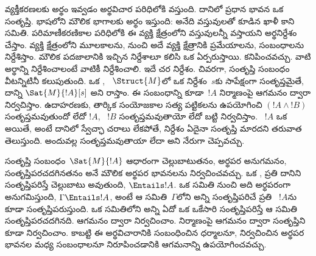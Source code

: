 \documentclass[../../../include/open-logic-section]{subfiles}
\begin{document}


వ్యక్తీకరణలకు అర్థం ఇవ్వడం అర్థవిచార పరిధిలోకి వస్తుంది. దానిలో ప్రధాన భావన ఒక  సంతృప్తి.  భాషలోని
మౌలిక భాగాలకు అర్థం ఇస్తుంది:  అనేది వస్తువులతో కూడిన ఖాళీ కాని
సమితి. పరిమాణీకరణికాల పరిధిలోకి ఈ వ్యక్తి క్షేత్రంలోని వస్తువులన్నీ వస్తాయని
అర్థనిర్దేశం చేస్తాం.  వ్యక్తి క్షేత్రంలోని మూలకాలను,
  నుంచి అదే వ్యక్తి క్షేత్రానికి ప్రమేయాలను,
  సంబంధాలను నిర్దేశిస్తాం. మౌలిక
పదజాలానికి ఇచ్చిన నిర్దేశాలూ  కలిసి ఒక 
ఏర్పరుస్తాయి.   కనిపించవచ్చు. వాటి అర్థాన్ని నిర్దేశించాలంటే
  వాటికీ నిర్దేశించాలి. ఇదే చర నిర్దేశం. చివరగా, సంతృప్తి సంబంధం వీటన్నిటినీ
కలుపుతుంది. ఒక , ~$\Struct{M}$లో
ఒక  నిర్దేశం~$s$కు సాపేక్షంగా సంతృప్తమైతే, దాన్ని
$\Sat{M}{!A}[s]$ అని రాస్తాం. ఈ సంబంధాన్ని కూడా~$!A$ నిర్మాణంపై
ఆగమనం ద్వారా నిర్వచిస్తాం. ఉదాహరణకు, తార్కిక సంయోజకాల సత్య
పట్టికలను ఉపయోగించి $(!A \land !B)$ సంతృప్తమవుతుందో లేదో $!A$, ~$!B$
సంతృప్తమవుతాయో లేదో బట్టి నిర్వచిస్తాం. ~$!A$ ఒక
 అయితే, అంటే దానిలో స్వేచ్ఛా చరాలు లేకపోతే,
 నిర్దేశం ఏదైనా సంతృప్తి మారదని తరువాత తెలుస్తుంది. అందువల్ల
  సంతృప్తమవుతాయా లేదా అని నేరుగా చెప్పవచ్చు.

 సంతృప్తి సంబంధం~$\Sat{M}{!A}$ ఆధారంగా
చెల్లుబాటుతనం, అర్థపర అనుగమనం, సంతృప్తిపరచదగినతనం అనే మౌలిక
అర్థపర భావనలను నిర్వచించవచ్చు. ఒక , ప్రతి
 దానిని సంతృప్తిపరిస్తే చెల్లుబాటు అవుతుంది,
$\Entails !A$. ఒక  సమితి నుంచి అది అర్థపరంగా
అనుగమిస్తుంది, $\Gamma \Entails !A$, అంటే ఆ సమితి~$\Gamma$లోని అన్ని
 సంతృప్తిపరిచే ప్రతి  ~$!A$ను కూడా సంతృప్తిపరుస్తుంది.
ఒక  సమితిలోని అన్ని  ఏదో ఒక
 ఒకేసారి సంతృప్తిపరిస్తే ఆ సమితి
సంతృప్తిపరచదగినది.  ఆగమనం ద్వారా నిర్వచించాం.
 నిర్మాణంపై ఆగమనం ద్వారా సంతృప్తిని కూడా నిర్వచించాం. కాబట్టి
ఈ అర్థవిచారానికి సంబంధించిన ధర్మాలనూ, నిర్వచించిన అర్థపర భావనల
మధ్య సంబంధాలనూ నిరూపించడానికి ఆగమనాన్ని ఉపయోగించవచ్చు.
\end{document}
